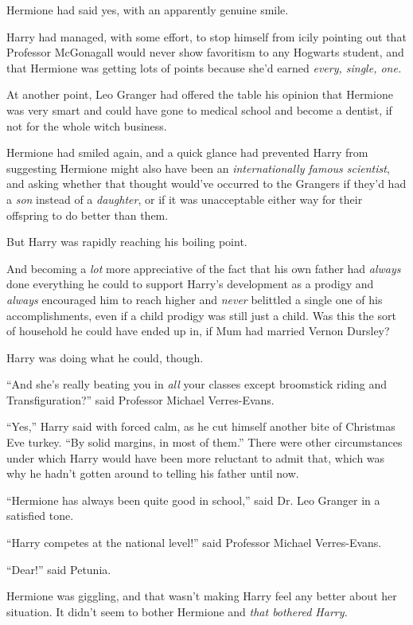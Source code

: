 Hermione had said yes, with an apparently genuine smile.

Harry had managed, with some effort, to stop himself from icily pointing out that Professor McGonagall would never show favoritism to any Hogwarts student, and that Hermione was getting lots of points because she'd earned \emph{every, single, one.}

At another point, Leo Granger had offered the table his opinion that Hermione was very smart and could have gone to medical school and become a dentist, if not for the whole witch business.

Hermione had smiled again, and a quick glance had prevented Harry from suggesting Hermione might also have been an \emph{internationally famous scientist}, and asking whether that thought would've occurred to the Grangers if they'd had a \emph{son} instead of a \emph{daughter}, or if it was unacceptable either way for their offspring to do better than them.

But Harry was rapidly reaching his boiling point.

And becoming a \emph{lot} more appreciative of the fact that his own father had \emph{always} done everything he could to support Harry's development as a prodigy and \emph{always} encouraged him to reach higher and \emph{never} belittled a single one of his accomplishments, even if a child prodigy was still just a child. Was this the sort of household he could have ended up in, if Mum had married Vernon Dursley?

Harry was doing what he could, though.

``And she's really beating you in \emph{all} your classes except broomstick riding and Transfiguration?'' said Professor Michael Verres-Evans.

``Yes,'' Harry said with forced calm, as he cut himself another bite of Christmas Eve turkey. ``By solid margins, in most of them.'' There were other circumstances under which Harry would have been more reluctant to admit that, which was why he hadn't gotten around to telling his father until now.

``Hermione has always been quite good in school,'' said Dr. Leo Granger in a satisfied tone.

``Harry competes at the national level!'' said Professor Michael Verres-Evans.

``Dear!'' said Petunia.

Hermione was giggling, and that wasn't making Harry feel any better about her situation. It didn't seem to bother Hermione and \emph{that bothered Harry.}

